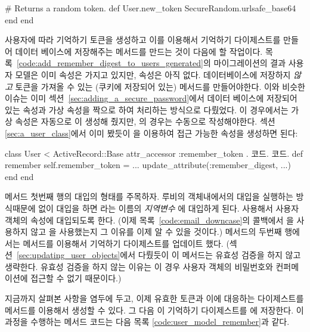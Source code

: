 {{\begin{codelisting}
\begin{code}
# Returns a random token. def User.new_token SecureRandom.urlsafe_base64 end end \end{code} \end{codelisting} 

사용자에 따라 기억하기 토큰을 생성하고 이를 이용해서 기억하기 다이제스트를 만들어 데이터 베이스에 저장해주는 메서드를 만드는 것이 다음에 할 작업이다. 목록~\ref{code:add_remember_digest_to_users_generated}의 마이그레이션의 결과 사용자 모델은 이미  속성은 가지고 있지만,  속성은 아직 없다. 데이터베이스에 저장하지 \emph{않고} 토큰을 가져올 수 있는 (쿠키에 저장되어 있는) 메서드를 만들어야한다. 이와 비슷한 이슈는 이미 섹션~\ref{sec:adding_a_secure_password}에서 데이터 베이스에 저장되어 있는  속성과 가상  속성을 짝으로 하여 처리하는 방식으로 다뤘었다. 이 경우에서는 가상  속성은 자동으로 이 생성해 줬지만, 의 경우는 수동으로 작성해야한다. 섹션 \ref{sec:a_user_class}에서 이미 봤듯이 을 이용하여 접근 가능한 속성을 생성하면 된다: 

\begin{code} class User < ActiveRecord::Base attr_accessor :remember_token . 코드. 코드. def remember self.remember_token = ... update_attribute(:remember_digest, ...) end end \end{code} 

\noindent {} 메서드 첫번째 행의 대입의 형태를 주목하자. 루비의 객체내에서의 대입을 실행하는 방식때문에 없이 대입을 하면 라는 이름의 \emph{지역변수} 에 대입하게 된다. 사용해서 사용자 객체의  속성에 대입되도록 한다. (이제 목록~\ref{code:email_downcase}의  콜백에서 을 사용하지 않고 을 사용했는지 그 이유를 이제 알 수 있을 것이다.)   메서드의 두번째 행에서는  메서드를 이용해서 기억하기 다이제스트를 업데이트 했다. (섹션~\ref{sec:updating_user_objects}에서 다뤘듯이 이 메서드는 유효성 검증을 하지 않고 생략한다. 유효성 검증을 하지 않는 이유는 이 경우 사용자 객체의 비밀번호와 컨퍼메이션에 접근할 수 없기 때문이다.) 

지금까지 살펴본 사항을 염두에 두고, 이제 유효한 토큰과 이에 대응하는 다이제스트를 메서드를 이용해서 생성할 수 있다. 그 다음 이 기억하기 다이제스트를 에 저장한다. 이 과정을 수행하는  메서드 코드는 다음 목록 \ref{code:user_model_remember}과 같다. 

}}
